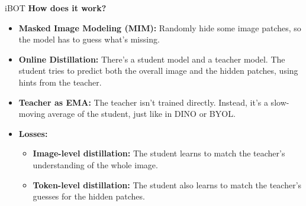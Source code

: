 \begin{frame}[allowframebreaks]{iBOT}
\textbf{How does it work?}
\begin{itemize}
    \item \textbf{Masked Image Modeling (MIM):} Randomly hide some image patches, so the model has to guess what's missing.
    \item \textbf{Online Distillation:} There's a student model and a teacher model. The student tries to predict both the overall image and the hidden patches, using hints from the teacher.
    \item \textbf{Teacher as EMA:} The teacher isn't trained directly. Instead, it's a slow-moving average of the student, just like in DINO or BYOL.
    \item \textbf{Losses:}
    \begin{itemize}
        \item \textbf{Image-level distillation:} The student learns to match the teacher's understanding of the whole image.
        \item \textbf{Token-level distillation:} The student also learns to match the teacher's guesses for the hidden patches.
    \end{itemize}
\end{itemize}

\framebreak


\end{frame}
